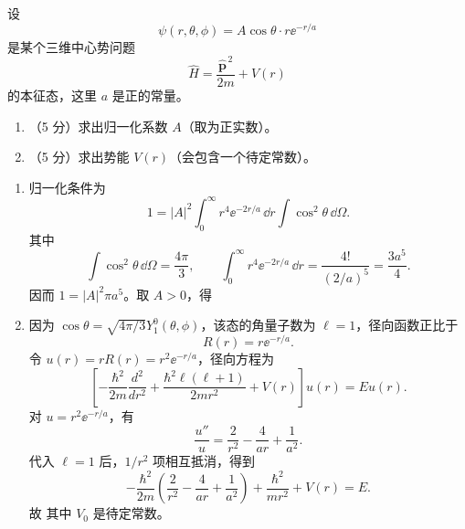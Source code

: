 \begin{question}[共 10 分]
设
\[
\psi(r,\theta,\phi)=A\cos\theta\cdot r\ee^{-r/a}
\]
是某个三维中心势问题
\[
\hat H=\frac{\hat{\mathbf p}^{\,2}}{2m}+V(r)
\]
的本征态，这里 $a$ 是正的常量。
\begin{enumerate}
  \item （5 分）求出归一化系数 $A$（取为正实数）。
  \item （5 分）求出势能 $V(r)$（会包含一个待定常数）。
\end{enumerate}
\begin{solution}
\begin{enumerate}
  \item 归一化条件为
  \[
  1=|A|^2\int_0^\infty r^4\ee^{-2r/a}\,\dd{r}\int\cos^2\theta\,\dd{\Omega}.
  \]
  其中
  \[
  \int\cos^2\theta\,\dd{\Omega}=\frac{4\pi}{3},
  \qquad
  \int_0^\infty r^4\ee^{-2r/a}\,\dd{r}=\frac{4!}{(2/a)^5}=\frac{3a^5}{4}.
  \]
  因而 $1=|A|^2\pi a^5$。取 $A>0$，得
  \item 因为 $\cos\theta=\sqrt{4\pi/3}Y_1^0(\theta,\phi)$，该态的角量子数为 $\ell=1$，径向函数正比于
  \[
  R(r)=r\ee^{-r/a}.
  \]
  令 $u(r)=rR(r)=r^2\ee^{-r/a}$，径向方程为
  \[
  \left[-\frac{\hbar^2}{2m}\frac{d^2}{dr^2}+\frac{\hbar^2\ell(\ell+1)}{2mr^2}+V(r)\right]u(r)=E u(r).
  \]
  对 $u=r^2\ee^{-r/a}$，有
  \[
  \frac{u''}{u}=\frac{2}{r^2}-\frac{4}{ar}+\frac{1}{a^2}.
  \]
  代入 $\ell=1$ 后，$1/r^2$ 项相互抵消，得到
  \[
  -\frac{\hbar^2}{2m}\left(\frac{2}{r^2}-\frac{4}{ar}+\frac{1}{a^2}\right)
  +\frac{\hbar^2}{mr^2}+V(r)=E.
  \]
  故
  其中 $V_0$ 是待定常数。
\end{enumerate}
\end{solution}
\end{question}

